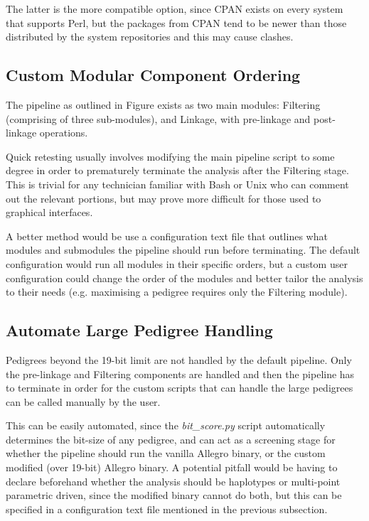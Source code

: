 The latter is the more compatible option, since CPAN exists on every system that supports Perl, but the packages from CPAN tend to be newer than those distributed by the system repositories and this may cause clashes.


\subsection{Custom Modular Component Ordering}

The pipeline as outlined in Figure exists as two main modules: Filtering (comprising of three sub-modules), and Linkage, with pre-linkage and post-linkage operations.

Quick retesting usually involves modifying the main pipeline script to some degree in order to prematurely terminate the analysis after the Filtering stage. This is trivial for any technician familiar with Bash or Unix who can comment out the relevant portions, but may prove more difficult for those used to graphical interfaces.

A better method would be use a configuration text file that outlines what modules and submodules the pipeline should run before terminating. The default configuration would run all modules in their specific orders, but a custom user configuration could change the order of the modules and better tailor the analysis to their needs (e.g. maximising a pedigree requires only the Filtering module).

\subsection{Automate Large Pedigree Handling}

Pedigrees beyond the 19-bit limit are not handled by the default pipeline. Only the pre-linkage and Filtering components are handled and then the pipeline has to terminate in order for the custom scripts that can handle the large pedigrees can be called manually by the user.

This can be easily automated, since the \textit{bit\_score.py} script automatically determines the bit-size of any pedigree, and can act as a screening stage for whether the pipeline should run the vanilla Allegro binary, or the custom modified (over 19-bit) Allegro binary. A potential pitfall would be having to declare beforehand whether the analysis should be haplotypes or multi-point parametric driven, since the modified binary cannot do both, but this can be specified in a configuration text file mentioned in the previous subsection.

